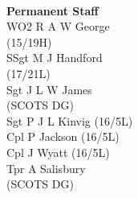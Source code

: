 \begin{multicols}{3}
  \\
  \textbf{Permanent Staff} \\
  WO2 R A W George \\ \indent (15/19H) \\
  SSgt M J Handford \\ \indent (17/21L) \\
  Sgt J L W James \\ \indent (SCOTS DG) \\
  Sgt P J L Kinvig (16/5L) \\
  Cpl P Jackson (16/5L) \\
  Cpl J Wyatt (16/5L) \\
  Tpr A Salisbury \\ \indent (SCOTS DG) \\
\end{multicols}
